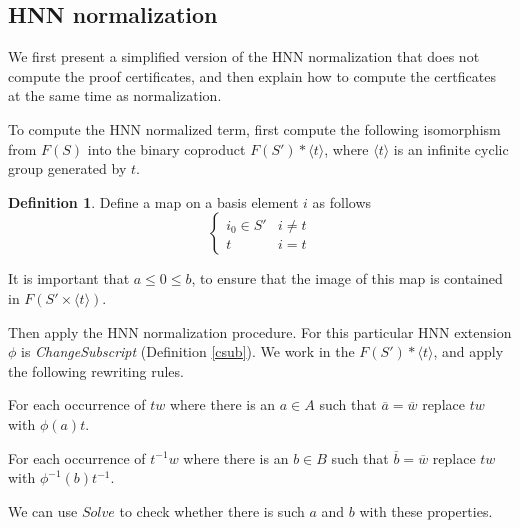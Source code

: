 \documentclass[11pt]{article} %
\theoremstyle{definition}
\theoremstyle{definition}
\theoremstyle{definition}
\theoremstyle{definition}
\theoremstyle{definition}
\newtheorem{defn}[theorem]{Definition}
\theoremstyle{definition}
\begin{document}
\subsection{HNN normalization}\label{HNNnorm}

We first present a simplified version of the HNN normalization that does not compute
the proof certificates, and then explain how to compute the certficates at the
same time as normalization.

To compute the HNN normalized term,
first compute the following isomorphism from $F(S)$ into the binary
coproduct $F(S') \ast \langle t \rangle$, where $\langle t \rangle$ is an infinite
cyclic group generated by $t$.

\begin{defn}\label{tocoprod}
  Define a map on a basis element $i$ as follows
  \begin{equation}
    \begin{cases}
      i_0 \in S' & i \ne t \\
      t & i = t
    \end{cases}
  \end{equation}
\end{defn}

It is important that $a \le 0 \le b$, to ensure that the image
of this map is contained in $F(S' \times \langle t \rangle)$.

Then apply the HNN normalization procedure. For this particular HNN extension
$\phi$ is \textit{ChangeSubscript} (Definition \ref{csub}).
We work in the $F(S') \ast \langle t \rangle$, and apply the following rewriting rules.

For each occurrence of $tw$ where there is an $a \in A$ such that
$\overline{a} = \overline{w}$ replace $tw$ with $\phi(a)t$.

For each occurrence of $t^{-1}w$ where there is an $b \in B$ such that
$\overline{b} = \overline{w}$ replace $tw$ with $\phi^{-1}(b)t^{-1}$.

We can use $\textit{Solve}$ to check whether there is such $a$ and $b$ with
these properties.



\end{document}
